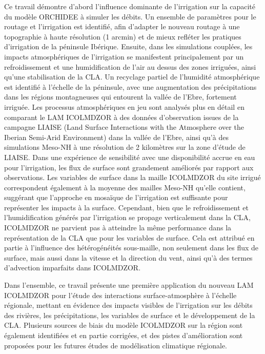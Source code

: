 \documentclass{report}
\begin{document}
Ce travail démontre d'abord l'influence dominante de l'irrigation sur la capacité du modèle ORCHIDEE à simuler les débits. Un ensemble de paramètres pour le routage et l'irrigation est identifié, afin d'adapter le nouveau routage à une topographie à haute résolution (1 arcmin) et de mieux refléter les pratiques d'irrigation de la péninsule Ibérique.
Ensuite, dans les simulations couplées, les impacts atmosphériques de l'irrigation se manifestent principalement par un refroidissement et une humidification de l'air au dessus des zones irriguées, ainsi qu'une stabilisation de la CLA. Un recyclage partiel de l'humidité atmosphérique est identifié à l'échelle de la péninsule, avec une augmentation des précipitations dans les régions montagneuses qui entourent la vallée de l'Ebre, fortement irriguée.
Les processus atmosphériques en jeu sont analysés plus en détail en comparant le LAM ICOLMDZOR à des données d'observation issues de la campagne LIAISE (Land Surface Interactions with the Atmosphere over the Iberian Semi-Arid Environment) dans la vallée de l'Ebre, ainsi qu'à des simulations Meso-NH à une résolution de 2 kilomètres sur la zone d'étude de LIAISE.
Dans une expérience de sensibilité avec une disponibilité accrue en eau pour l'irrigation, les flux de surface sont grandement améliorés par rapport aux observations. Les variables de surface dans la maille ICOLMDZOR du site irrigué correspondent également à la moyenne des mailles Meso-NH qu'elle contient, suggérant que l'approche en mosaïque de l'irrigation est suffisante pour représenter les impacts à la surface. Cependant, bien que le refroidissement et l'humidification générés par l'irrigation se propage verticalement dans la CLA, ICOLMDZOR ne parvient pas à atteindre la même performance dans la représentation de la CLA que pour les variables de surface. Cela est attribué en partie à l'influence des hétérogénéités sous-maille, non seulement dans les flux de surface, mais aussi dans la vitesse et la direction du vent, ainsi qu'à des termes d'advection imparfaits dans ICOLMDZOR.

Dans l'ensemble, ce travail présente une première application du nouveau LAM ICOLMDZOR pour l'étude des interactions surface-atmosphère à l'échelle régionale, mettant en évidence des impacts visibles de l'irrigation sur les débits des rivières, les précipitations, les variables de surface et le développement de la CLA.
Plusieurs sources de biais du modèle ICOLMDZOR sur la région sont également identifiées et en partie corrigées, et des pistes d'amélioration sont proposées pour les futures études de modélisation climatique régionale.
\end{document}
